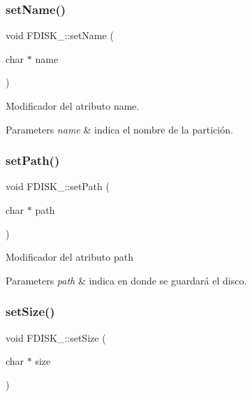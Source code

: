 \subsubsection{\texorpdfstring{set\+Name()}{setName()}}
{\footnotesize\ttfamily void F\+D\+I\+S\+K\+\_\+\+::set\+Name (\begin{DoxyParamCaption}\item[{char $\ast$}]{name }\end{DoxyParamCaption})\hspace{0.3cm}{\ttfamily [inline]}}

Modificador del atributo name. 
\begin{DoxyParams}{Parameters}
{\em name} & indica el nombre de la partición. \\
\hline
\end{DoxyParams}
\mbox{\label{classFDISK___a7dbf2da61853e0ac59c6ce48862d4013}} 
\subsubsection{\texorpdfstring{set\+Path()}{setPath()}}
{\footnotesize\ttfamily void F\+D\+I\+S\+K\+\_\+\+::set\+Path (\begin{DoxyParamCaption}\item[{char $\ast$}]{path }\end{DoxyParamCaption})\hspace{0.3cm}{\ttfamily [inline]}}

Modificador del atributo path 
\begin{DoxyParams}{Parameters}
{\em path} & indica en donde se guardará el disco. \\
\hline
\end{DoxyParams}
\mbox{\label{classFDISK___ac62891d61885c9e3e5d416b11f067c5b}} 
\subsubsection{\texorpdfstring{set\+Size()}{setSize()}}
{\footnotesize\ttfamily void F\+D\+I\+S\+K\+\_\+\+::set\+Size (\begin{DoxyParamCaption}\item[{char $\ast$}]{size }\end{DoxyParamCaption})\hspace{0.3cm}{\ttfamily [inline]}}

